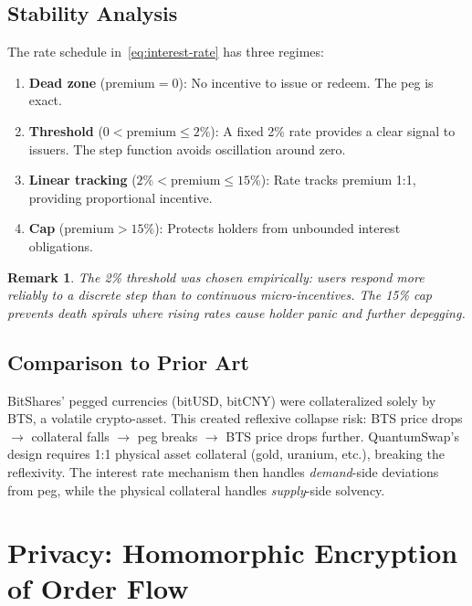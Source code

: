 \documentclass[11pt,a4paper]{article}
\newtheorem{remark}{Remark}[section]
\begin{document}
\subsection{Stability Analysis}

The rate schedule in~\eqref{eq:interest-rate} has three regimes:

\begin{enumerate}[nosep]
  \item \textbf{Dead zone} ($\text{premium} = 0$): No incentive to
        issue or redeem. The peg is exact.
  \item \textbf{Threshold} ($0 < \text{premium} \leq 2\%$): A fixed
        2\% rate provides a clear signal to issuers. The step function
        avoids oscillation around zero.
  \item \textbf{Linear tracking} ($2\% < \text{premium} \leq 15\%$):
        Rate tracks premium 1:1, providing proportional incentive.
  \item \textbf{Cap} ($\text{premium} > 15\%$): Protects holders from
        unbounded interest obligations.
\end{enumerate}

\begin{remark}
The 2\% threshold was chosen empirically: users respond more
reliably to a discrete step than to continuous micro-incentives. The
15\% cap prevents death spirals where rising rates cause holder panic
and further depegging.
\end{remark}

\subsection{Comparison to Prior Art}

BitShares' pegged currencies (bitUSD, bitCNY) were collateralized
solely by BTS, a volatile crypto-asset. This created reflexive
collapse risk: BTS price drops $\rightarrow$ collateral falls
$\rightarrow$ peg breaks $\rightarrow$ BTS price drops further.
QuantumSwap's design requires 1:1 physical asset collateral (gold,
uranium, etc.), breaking the reflexivity. The interest rate mechanism
then handles \emph{demand}-side deviations from peg, while the
physical collateral handles \emph{supply}-side solvency.

\section{Privacy: Homomorphic Encryption of Order Flow}
\end{document}
